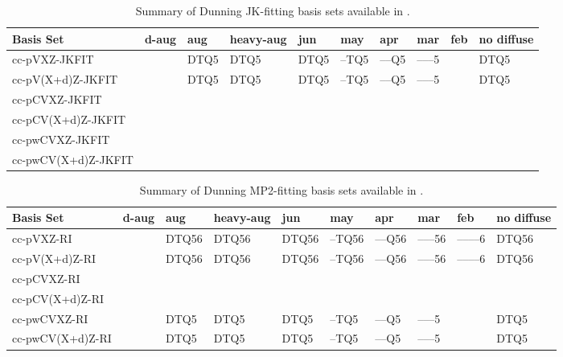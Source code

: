 \begin{table}[!htbp]
\begin{footnotesize}
\caption{Summary of Dunning JK-fitting basis sets available in \PSIfour.} \label{table:basisDunningJKFIT}
\parsep 5pt
\begin{center}
\begin{tabular}{llllllllll} 
\hline\hline
Basis Set            & d-aug & aug & heavy-aug\cite{basisnote1} & jun & may & apr & mar & feb & no diffuse \\ 
\hline
cc-pVXZ-JKFIT\cite{basisnote2}   &  & DTQ5  & DTQ5  & DTQ5  & --TQ5  & --{}--Q5  & --{}--{}--5  &  & DTQ5  \\
cc-pV(X+d)Z-JKFIT                &  & DTQ5  & DTQ5  & DTQ5  & --TQ5  & --{}--Q5  & --{}--{}--5  &  & DTQ5  \\
cc-pCVXZ-JKFIT\cite{basisnote2}  &  &  &  &  &  &  &  &  &  \\
cc-pCV(X+d)Z-JKFIT               &  &  &  &  &  &  &  &  &  \\
cc-pwCVXZ-JKFIT\cite{basisnote2} &  &  &  &  &  &  &  &  &  \\
cc-pwCV(X+d)Z-JKFIT              &  &  &  &  &  &  &  &  &  \\
\hline\hline
\end{tabular}
\end{center}
\end{footnotesize}
\end{table}


\begin{table}[!htbp]
\begin{footnotesize}
\caption{Summary of Dunning MP2-fitting basis sets available in \PSIfour.} \label{table:basisDunningMP2FIT}
\parsep 5pt
\begin{center}
\begin{tabular}{llllllllll} 
\hline\hline
Basis Set            & d-aug & aug & heavy-aug\cite{basisnote1} & jun & may & apr & mar & feb & no diffuse \\ 
\hline
cc-pVXZ-RI           &  & DTQ56 & DTQ56 & DTQ56 & --TQ56 & --{}--Q56 & --{}--{}--56 & --{}--{}--{}--6 & DTQ56 \\
cc-pV(X+d)Z-RI       &  & DTQ56 & DTQ56 & DTQ56 & --TQ56 & --{}--Q56 & --{}--{}--56 & --{}--{}--{}--6 & DTQ56 \\
cc-pCVXZ-RI          &  &  &  &  &  &  &  &  &  \\
cc-pCV(X+d)Z-RI      &  &  &  &  &  &  &  &  &  \\
cc-pwCVXZ-RI         &  & DTQ5  & DTQ5  & DTQ5  & --TQ5  & --{}--Q5  & --{}--{}--5  &                 & DTQ5  \\
cc-pwCV(X+d)Z-RI     &  & DTQ5  & DTQ5  & DTQ5  & --TQ5  & --{}--Q5  & --{}--{}--5  &                 & DTQ5  \\
\hline\hline
\end{tabular}
\end{center}
\end{footnotesize}
\end{table}


